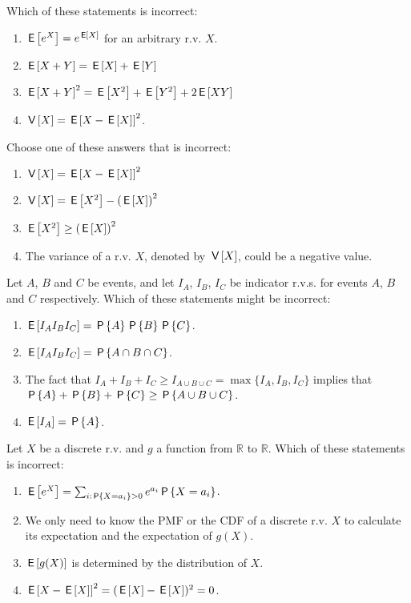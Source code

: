 \documentclass[poll_tutorial_format]{subfiles}
\begin{document}
	
	\begin{exercise}
		Which of these statements is incorrect: 
		\begin{enumerate}
			\item $\E{e^X}=e^{\E{X}}$ for an arbitrary r.v. $X$.  
			\item $\E{X+Y}=\E{X}+\E{Y}$
			\item $\E{X+Y}^2 =\E{X^2} +\E{Y^2} +2\E{XY}$  
			\item $\V{X}=\E{X-\E{X} }^2$.  
		\end{enumerate}
	\end{exercise}
	
	
		
	\begin{exercise}
		Choose one of these answers that is incorrect:
		\begin{enumerate}
			\item $\V{X}=\E{X-\E{X} }^2$  
			\item $\V{X}=\E{X^2} -\left(\E{X} \right)^2$
			\item $\E{X^2} \geq \left(\E{X} \right)^2$  
			\item The variance of a r.v. $X$, denoted by $\V{X}$, could be a negative value.
		\end{enumerate}
	\end{exercise}
	
	
	\begin{exercise}
		Let $A$, $B$ and $C$ be events, and let $I_A$, $I_B$, $I_C$ be indicator r.v.s. for events $A$, $B$  and $C$ respectively. 
		Which of these statements might be incorrect: 
		\begin{enumerate}
			\item $\E{I_AI_BI_C}=\P{A}\P{B}\P{C}$.
			\item $\E{I_AI_BI_C}=\P{A\cap B\cap C}$.  
			\item The fact that $I_A+I_B+I_C \geq I_{A\cup B \cup C}= \max\{I_A, I_B, I_C\}$ implies that $\P{A}+\P{B}+\P{C} \geq \P{A\cup B \cup C}$.
			\item $\E{I_A}=\P{A}$.
		\end{enumerate}
	\end{exercise}
	 

	\begin{exercise}
		Let $X$ be a discrete r.v. and $g$ a function from $\mathbb{R}$ to $\mathbb{R}$.
		Which of these statements is incorrect: 
		\begin{enumerate}
			\item $\E{e^X}= \sum_{i: \P{X=a_i}>0} e^{a_i} \P{X=a_i}$.
			\item We only need to know the PMF or the CDF of a discrete r.v. $X$ to calculate its expectation and the expectation of $g(X)$.
			\item $\E{g(X)}$ is determined by the distribution of $X$.
			\item $\E{X-\E{X}}^2 = (\E{X}-\E{X})^2=0$.
		\end{enumerate}
	\end{exercise}
	
\end{document}
